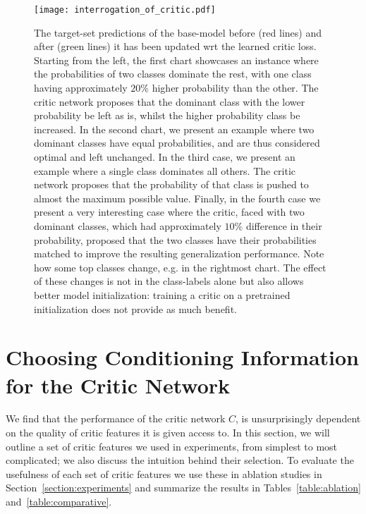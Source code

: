 \documentclass{article} \usepackage[dvipsnames]{xcolor}
\begin{document}
 \begin{figure}[!htbp]
     \centering
     \texttt{[image: interrogation\_of\_critic.pdf]}
     \caption{The target-set predictions of the base-model before (red lines) and after (green lines) it has been updated wrt the learned critic loss. Starting from the left, the first chart showcases an instance where the probabilities of two classes dominate the rest, with one class having approximately $20\%$ higher probability than the other. The critic network proposes that the dominant class with the lower probability be left as is, whilst the higher probability class be increased. In the second chart, we present an example where two dominant classes have equal probabilities, and are thus considered optimal and left unchanged. In the third case, we present an example where a single class dominates all others. The critic network proposes that the probability of that class is pushed to almost the maximum possible value. Finally, in the fourth case we present a very interesting case where the critic, faced with two dominant classes, which had approximately $10\%$ difference in their probability, proposed that the two classes have their probabilities matched to improve the resulting generalization performance. Note how some top classes change, e.g. in the rightmost chart. The effect of these changes is not in the class-labels alone but also allows better model initialization: training a critic on a pretrained initialization does not provide as much benefit. 
}
     \label{fig:critic_insight_mini}
     \vspace{-5.0mm}
 \end{figure}
\raggedbottom






\section{Choosing Conditioning Information for the Critic Network}\label{section:critic-features}
We find that the performance of the critic network $C$, is unsurprisingly dependent on the quality of critic features it is given access to. In this section, we will outline a set of critic features we used in experiments, from simplest to most complicated; we also discuss the intuition behind their selection. To evaluate the usefulness of each set of critic features we use these in ablation studies in Section~\ref{section:experiments} and summarize the results in Tables~\ref{table:ablation} and~\ref{table:comparative}.
\end{document}

